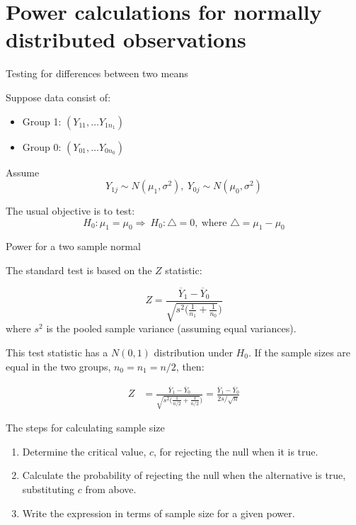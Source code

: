 \documentclass[ignorenonframetext,]{beamer}
\providecommand{\tightlist}{%
  \setlength{\itemsep}{0pt}\setlength{\parskip}{0pt}}
\begin{document}
\hypertarget{power-calculations-for-normally-distributed-observations}{%
\section{Power calculations for normally distributed
observations}\label{power-calculations-for-normally-distributed-observations}}

\begin{frame}{%
\protect\hypertarget{testing-for-differences-between-two-means}{%
Testing for differences between two means}}

Suppose data consist of:

\begin{itemize}
\tightlist
\item
  Group 1: \((Y_{11}, \dots Y_{1n_1})\)
\item
  Group 0: \((Y_{01}, \dots Y_{0n_0})\)
\end{itemize}

Assume \[
Y_{1j} \sim N(\mu_1,\sigma^2),  ~ Y_{0j} \sim N(\mu_0,\sigma^2)
\]

The usual objective is to test: \[ 
H_0:  \mu_1 = \mu_0 \Rightarrow  ~ H_0: \triangle = 0,~
\text{where } \triangle = \mu_1 - \mu_0
\]

\end{frame}

\begin{frame}{%
\protect\hypertarget{power-for-a-two-sample-normal}{%
Power for a two sample normal}}

The standard test is based on the \(Z\) statistic:

\[   Z = \frac{\overline{Y}_1 - \overline{Y}_0}
       {\sqrt{s^2 (\frac{1}{n_1} +\frac{1}{n_0}})} \] where \(s^2\) is
the pooled sample variance (assuming equal variances).

This test statistic has a \(N(0,1)\) distribution under \(H_0\). If the
sample sizes are equal in the two groups, \(n_0=n_1=n/2\), then:

\begin{align*}
Z &= \frac{\overline{Y}_1 - \overline{Y}_0}
{\sqrt{s^2 (\frac{1}{n/2} +\frac{1}{n/2}})} = 
\frac{\overline{Y}_1 - \overline{Y}_0}{2s/\sqrt{n}}
\end{align*}

\end{frame}

\begin{frame}{%
\protect\hypertarget{the-steps-for-calculating-sample-size}{%
The steps for calculating sample size}}

\begin{enumerate}
[1.]
\item
  Determine the critical value, \(c\), for rejecting the null when it is
  true.
\item
  Calculate the probability of rejecting the null when the alternative
  is true, substituting \(c\) from above.
\item
  Write the expression in terms of sample size for a given power.
\end{enumerate}

\end{frame}
\end{document}
